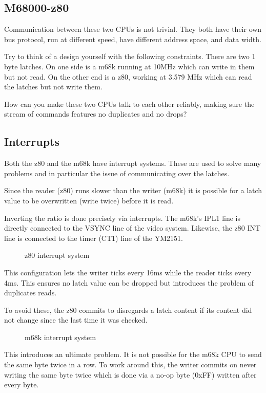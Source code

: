 \subsection{M68000-z80} Communication between these two CPUs is not trivial. They both have their own bus protocol, run at different speed, have different address space, and data width.

Try to think of a design yourself with the following constraints. There are two 1 byte latches. On one side is a m68k running at 10MHz which can write in them but not read. On the other end is a z80, working at 3.579 MHz which can read the latches but not write them. 

How can you make these two CPUs talk to each other reliably, making sure the stream of commands features no duplicates and no drops?

\subsection{Interrupts}

Both the z80 and the m68k have interrupt systems. These are used to solve many problems and in particular the issue of communicating over the latches.

Since the reader (z80) runs slower than the writer (m68k) it is possible for a latch value to be overwritten (write twice) before it is read. 

Inverting the ratio is done precisely via interrupts. The m68k's IPL1 line is directly connected to the VSYNC line of the video system. Likewise, the z80 INT line is connected to the timer (CT1) line of the YM2151.

\begin{figure}[H]
\caption*{z80 interrupt system}
\end{figure}

This configuration lets the writer ticks every 16ms while the reader ticks every 4ms. This ensures no latch value can be dropped but introduces the problem of duplicates reads.

To avoid these, the z80 commits to disregards a latch content if its content did not change since the last time it was checked.

\begin{figure}[H]
\caption*{m68k interrupt system}
\end{figure}

This introduces an ultimate problem. It is not possible for the m68k CPU to send the same byte twice in a row. To work around this, the writer commits on never writing the same byte twice which is done via a no-op byte (0xFF) written after every byte.




